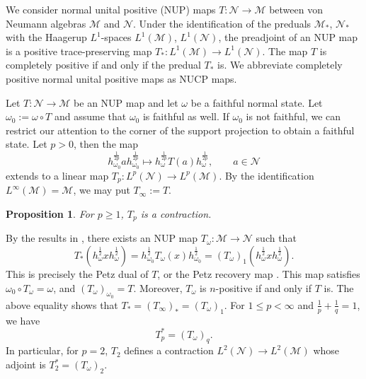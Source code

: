 \documentclass[12pt]{article}
\def\Ne{\mathcal N}
\def\Me{\mathcal M}
\newtheorem{prop}{Proposition}
\theoremstyle{definition}
\theoremstyle{remark}
\begin{document}
We consider normal unital positive (NUP) maps $T:\Ne\to \Me$ between von Neumann algebras $\Me$ and $\Ne$.
Under the identification of the preduals $\Me_*$, $\Ne_*$ with the Haagerup $L^1$-spaces $L^1(\Me)$, $L^1(\Ne)$, the preadjoint of an NUP map is a positive trace-preserving map $T_*:L^1(\Me)\to L^1(\Ne)$.
The map $T$ is  completely positive if and only if the predual $T_*$ is.
We abbreviate completely positive normal unital positive maps as NUCP maps.




Let $T:\Ne\to \Me$ be an NUP map and let $\omega$ be a faithful normal state. 
Let $\omega_0:=\omega\circ T$ and assume that $\omega_0$ is faithful as well. 
If $\omega_0$ is not faithful, we can restrict our attention to the corner of the support projection to obtain a faithful state. 
Let $p>0$, then the map
\begin{equation}\label{eq:Tp}
h_{\omega_0}^{\frac{1}{2p}}ah_{\omega_0}^{\frac{1}{2p}}\mapsto
h_\omega^{\frac1{2p}}T(a)h_\omega^{\frac1{2p}},\qquad a\in \Ne
\end{equation}
extends to a linear map $T_p: L^p(\Ne)\to L^p(\Me)$. By the identification
$L^\infty(\Me)=\Me$, we may put $T_\infty:=T$. 
\begin{prop}\label{prop:contraction}\cite[Lemma 3.1]{hiai2024alphaz} For $p\ge 1$, $T_p$ is a contraction.

\end{prop}

By the results in \cite{jencova2018renyi}, there exists an NUP map $T_\omega: \Me\to \Ne$ such that
\[
T_*(h^{\frac12}_\omega x h^{\frac12}_\omega)= h_{\omega_0}^{\frac12}T_\omega(x)
h_{\omega_0}^{\frac12}=(T_\omega)_1(h^{\frac12}_\omega x h^{\frac12}_\omega).
\]
This is precisely the Petz dual of $T$, or the Petz recovery map \cite{petz_dual_1984}. This map satisfies
$\omega_0 \circ T_\omega=\omega$, and $(T_\omega)_{\omega_0}=T$. Moreover, $T_\omega$ is
$n$-positive if and only if $T$ is. 
The above equality shows that $T_*=(T_\infty)_*=(T_\omega)_1$. For $1\le p<\infty$ and $\frac1p+\frac1q=1$,  we have 
\begin{equation}\label{eq:tpq}
T_p^*=(T_\omega)_q.
\end{equation}
In particular, for $p=2$, $T_2$ defines a contraction 
$L^2(\Ne) \to L^2(\Me)$ whose adjoint is $T_2^*=(T_\omega)_2$.
\end{document}
